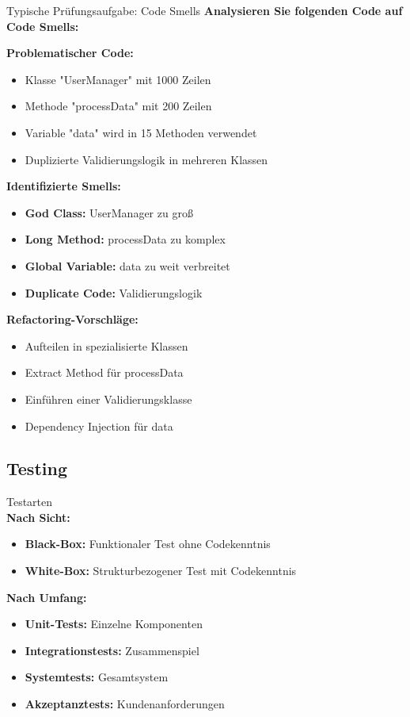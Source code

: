 \begin{example2}{Typische Prüfungsaufgabe: Code Smells}
\textbf{Analysieren Sie folgenden Code auf Code Smells:}

\textbf{Problematischer Code:}
\begin{itemize}
    \item Klasse "UserManager" mit 1000 Zeilen
    \item Methode "processData" mit 200 Zeilen
    \item Variable "data" wird in 15 Methoden verwendet
    \item Duplizierte Validierungslogik in mehreren Klassen
\end{itemize}

\textbf{Identifizierte Smells:}
\begin{itemize}
    \item \textbf{God Class:} UserManager zu groß
    \item \textbf{Long Method:} processData zu komplex
    \item \textbf{Global Variable:} data zu weit verbreitet
    \item \textbf{Duplicate Code:} Validierungslogik
\end{itemize}

\textbf{Refactoring-Vorschläge:}
\begin{itemize}
    \item Aufteilen in spezialisierte Klassen
    \item Extract Method für processData
    \item Einführen einer Validierungsklasse
    \item Dependency Injection für data
\end{itemize}
\end{example2}



\subsection{Testing}

\begin{definition}{Testarten}\\
\textbf{Nach Sicht:}
\begin{itemize}
    \item \textbf{Black-Box:} Funktionaler Test ohne Codekenntnis
    \item \textbf{White-Box:} Strukturbezogener Test mit Codekenntnis
\end{itemize}

\textbf{Nach Umfang:}
\begin{itemize}
    \item \textbf{Unit-Tests:} Einzelne Komponenten
    \item \textbf{Integrationstests:} Zusammenspiel
    \item \textbf{Systemtests:} Gesamtsystem
    \item \textbf{Akzeptanztests:} Kundenanforderungen
\end{itemize}
\end{definition}

